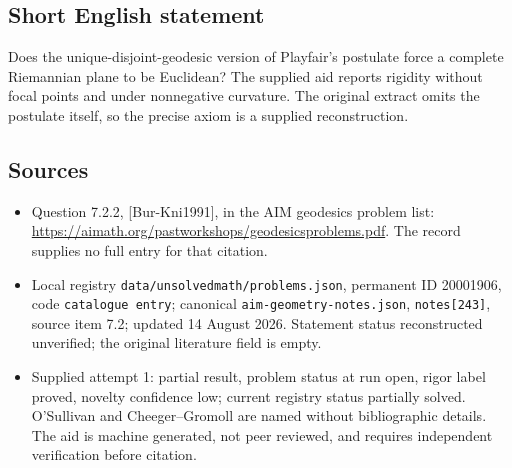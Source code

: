 \documentclass[11pt]{article}
\begin{document}
\subsection{Short English statement}
Does the unique-disjoint-geodesic version of Playfair's postulate force a complete Riemannian plane to be Euclidean? The supplied aid reports rigidity without focal points and under nonnegative curvature. The original extract omits the postulate itself, so the precise axiom is a supplied reconstruction.
\subsection{Sources}
\begin{itemize}
\item Question 7.2.2, [Bur-Kni1991], in the AIM geodesics problem list: \url{https://aimath.org/pastworkshops/geodesicsproblems.pdf}. The record supplies no full entry for that citation.
\item Local registry \texttt{data/unsolvedmath/problems.json}, permanent ID 20001906, code \texttt{catalogue entry}; canonical \texttt{aim-geometry-notes.json}, \texttt{notes[243]}, source item 7.2; updated 14 August 2026. Statement status reconstructed unverified; the original literature field is empty.
\item Supplied attempt 1: partial result, problem status at run open, rigor label proved, novelty confidence low; current registry status partially solved. O'Sullivan and Cheeger--Gromoll are named without bibliographic details. The aid is machine generated, not peer reviewed, and requires independent verification before citation.
\end{itemize}
\end{document}
